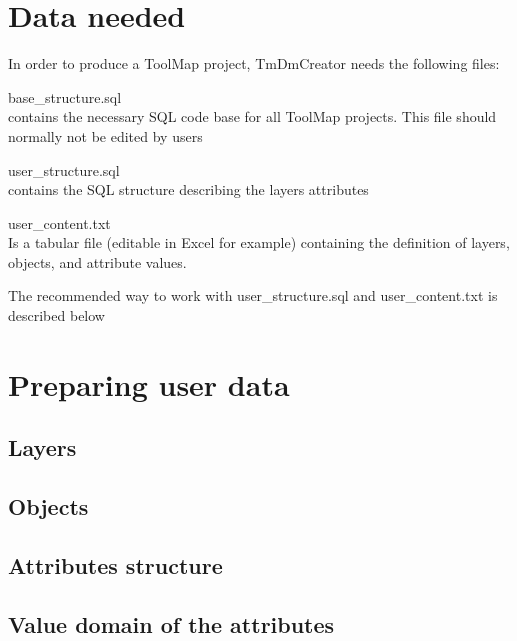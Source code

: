 \documentclass[a4paper, 12pt]{article}
\begin{document}
\section{Data needed}
In order to produce a ToolMap project, TmDmCreator needs the following files:
    \begin{description*}
  \item[base\_structure.sql]\hfill \\ contains the necessary SQL code base for all ToolMap projects. This file should normally not be edited by users
  \item[user\_structure.sql]\hfill \\ contains the SQL structure describing the layers attributes
  \item[user\_content.txt]\hfill \\ Is a tabular file (editable in Excel for example) containing the definition of layers, objects, and attribute values.
\end{description*}
The recommended way to work with user\_structure.sql and user\_content.txt is described below


\section{Preparing user data}

\subsection{Layers}

\subsection{Objects}

\subsection{Attributes structure}

\subsection{Value domain of the attributes}
\end{document}
